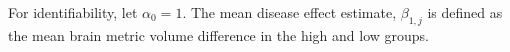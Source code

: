 For identifiability, let $\alpha_0 = 1$. The mean disease effect estimate, $\beta_{1,j}$ is defined as the mean brain metric volume difference in the high and low groups.